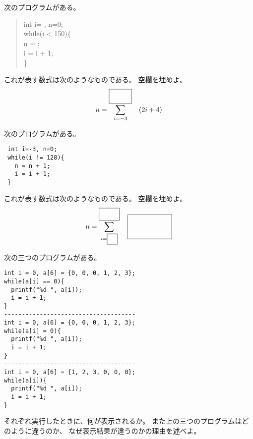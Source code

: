 \documentclass[12pt,a4j]{jarticle}
\def\an#1{}
\def\ds{\displaystyle}
\newcounter{toi}
\def\toi{%
\bigskip\bigskip\noindent
\addtocounter{toi}{1}
\shadowbox{\bfseries\large 問\thetoi}
\nopagebreak[4]\bigskip\nopagebreak[4]
}
\begin{document}
\begin{multicols}{2}
 

次のプログラムがある。
\begin{quote}\ttfamily%
int i= {\fbox{\hbox to 1cm{ \an{-3} \rule{0mm}{3mm}}}} , n=0;\\
while(i < 150)\{\\
\hspace*{1em}   n = \fbox{\hbox to 3cm{ \an{2*i+4} \rule[-1.5mm]{0mm}{5mm}}} ;\\
\hspace*{1em}   i = i + 1;\\
\}
\end{quote}
これが表す数式は次のようなものである。
空欄を埋めよ。
\[
n = \sum_{i=-3}^{\fbox{ \an{149} \hbox to .8cm{\rule[-1.5mm]{0mm}{5mm}}}}
\quad (2i+4)
\]

\end{multicols}






\toi

\begin{multicols}{2}
 
 次のプログラムがある。
 \begin{verbatim}
 int i=-3, n=0;
 while(i != 128){
   n = n + 1;
   i = i + 1;
 }
 \end{verbatim}
 これが表す数式は次のようなものである。
 空欄を埋めよ。
 \[
 n = \sum_{i=\raisebox{.5mm}{\fbox{\hbox to .3cm{\rule[-1.5mm]{0mm}{3mm}}}}}^{\fbox{\hbox to .8cm{\rule[-4mm]{0mm}{3mm}}}}
 \quad\fbox{\hbox to 2cm{\rule[-4mm]{0mm}{10mm}}}
 \]

\end{multicols}


\myanswer{

$ n = \ds\sum_{i=-3}^{127} 1$

}







\toi

\noindent
次の三つのプログラムがある。
\begin{verbatim}
int i = 0, a[6] = {0, 0, 0, 1, 2, 3};
while(a[i] == 0){
  printf("%d ", a[i]);
  i = i + 1;
}
-------------------------------------
int i = 0, a[6] = {0, 0, 0, 1, 2, 3};
while(a[i] = 0){
  printf("%d ", a[i]);
  i = i + 1;
}
-------------------------------------
int i = 0, a[6] = {1, 2, 3, 0, 0, 0};
while(a[i]){
  printf("%d ", a[i]);
  i = i + 1;
}
\end{verbatim}
それぞれ実行したときに、何が表示されるか。
また上の三つのプログラムはどのように違うのか、
なぜ表示結果が違うのかの理由を述べよ。
\end{document}

